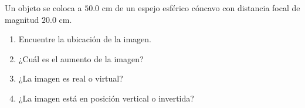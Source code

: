 \item Un objeto se coloca a $50.0\text{ cm}$ de un espejo esférico cóncavo con distancia focal de magnitud $20.0\text{ cm}$.
\begin{enumerate}
    \item Encuentre la ubicación de la imagen.
    \item ¿Cuál es el aumento de la imagen?
    \item ¿La imagen es real o virtual?
    \item ¿La imagen está en posición vertical o invertida?
\end{enumerate}